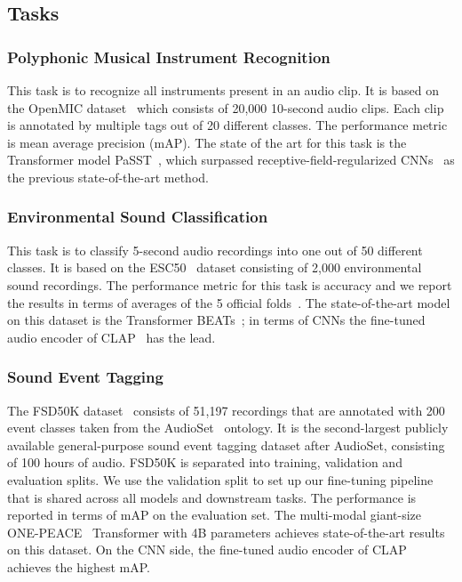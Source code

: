 \documentclass[lettersize,journal]{IEEEtran}
\begin{document}
\subsection{Tasks}

\subsubsection{Polyphonic Musical Instrument Recognition}

This task is to recognize all instruments present in an audio clip. It is based on the OpenMIC dataset~\cite{humphrey2018openmic} which consists of 20,000 10-second audio clips. Each clip is annotated by multiple tags out of 20 different classes. The performance metric is mean average precision (mAP). The state of the art for this task is the Transformer model PaSST~\cite{Koutini21Passt}, which surpassed receptive-field-regularized CNNs~\cite{Koutini21Receptive} as the previous state-of-the-art method.  

\subsubsection{Environmental Sound Classification}

This task is to classify 5-second audio recordings into one out of 50 different classes. It is based on the ESC50~\cite{piczak2015esc} dataset consisting of 2,000 environmental sound recordings. The performance metric for this task is accuracy and we report the results in terms of averages of the 5 official folds~\cite{piczak2015esc}. The state-of-the-art model on this dataset is the Transformer BEATs~\cite{chen2022beats}; in terms of CNNs the fine-tuned audio encoder of CLAP~\cite{elizalde2023clap} has the lead. 

\subsubsection{Sound Event Tagging}

The FSD50K dataset~\cite{fonseca2021fsd50k} consists of 51,197 recordings that are annotated with 200 event classes taken from the AudioSet~\cite{audioset2017Gemmeke} ontology. It is the second-largest publicly available general-purpose sound event tagging dataset after AudioSet, consisting of 100 hours of audio. FSD50K is separated into training, validation and evaluation splits. We use the validation split to set up our fine-tuning pipeline that is shared across all 
models and downstream tasks. The performance is reported in terms of mAP on the evaluation set. The multi-modal giant-size ONE-PEACE~\cite{wang2023one} Transformer with 4B parameters achieves state-of-the-art results on this dataset. On the CNN side, the fine-tuned  audio encoder of CLAP~\cite{elizalde2023clap} achieves the highest mAP.
\end{document}
